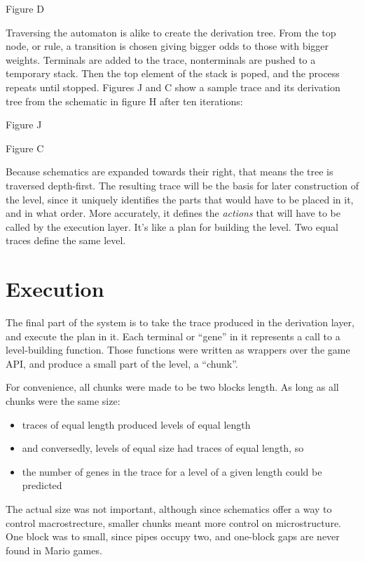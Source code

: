 \documentclass[conference]{IEEEtran}
\begin{document}
Figure D

Traversing the automaton is alike to create the derivation tree. From the top node, or rule, a transition is chosen giving bigger odds to those with bigger weights. Terminals are added to the trace, nonterminals are pushed to a temporary stack. Then the top element of the stack is poped, and the process repeats until stopped. Figures J and C show a sample trace and its derivation tree from the schematic in figure H after ten iterations:

Figure J

Figure C

Because schematics are expanded towards their right, that means the tree is traversed depth-first. The resulting trace will be the basis for later construction of the level, since it uniquely identifies the parts that would have to be placed in it, and in what order. More accurately, it defines the \textit{actions} that will have to be called by the execution layer. It's like a plan for building the level. Two equal traces define the same level.


\section{Execution}

The final part of the system is to take the trace produced in the derivation layer, and execute the plan in it. Each terminal or ``gene'' in it represents a call to a level-building function. Those functions were written as wrappers over the game API, and produce a small part of the level, a ``chunk''.

For convenience, all chunks were made to be two blocks length. As long as all chunks were the same size:

\begin{itemize}

	\item traces of equal length produced levels of equal length

	\item and conversedly, levels of equal size had traces of equal length, so

	\item the number of genes in the trace for a level of a given length could be predicted

\end{itemize}

The actual size was not important, although since schematics offer a way to control macrostrecture, smaller chunks meant more control on microstructure. One block was to small, since pipes occupy two, and one-block gaps are never found in Mario games.
\end{document}
